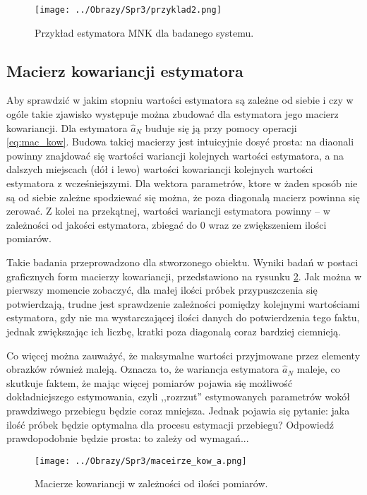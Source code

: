 \documentclass[12pt,a4paper]{article}
\begin{document}
\begin{figure}[H]
\centering
\texttt{[image: ../Obrazy/Spr3/przyklad2.png]} 
\caption{Przykład estymatora MNK dla badanego systemu.}
\label{fig:przyklad2}
\end{figure}

\subsection{Macierz kowariancji estymatora}
Aby sprawdzić w jakim stopniu wartości estymatora są zależne od siebie i czy w ogóle takie zjawisko występuje można zbudować dla estymatora jego macierz kowariancji.
Dla estymatora $\hat{a}_{N}$ buduje się ją przy pomocy operacji \ref{eq:mac_kow}.
Budowa takiej macierzy jest intuicyjnie dosyć prosta: na diaonali powinny znajdować się wartości wariancji kolejnych wartości estymatora, a na dalszych miejscach (dół i lewo) wartości kowariancji kolejnych wartości estymatora z wcześniejszymi. Dla wektora parametrów, ktore w żaden sposób nie są od siebie zależne spodziewać się można, że poza diagonalą macierz powinna się zerować.
Z kolei na przekątnej, wartości wariancji estymatora powinny -- w zależności od jakości estymatora, zbiegać do 0 wraz ze zwiększeniem ilości pomiarów.

Takie badania przeprowadzono dla stworzonego obiektu.
Wyniki badań w postaci graficznych form macierzy kowariancji, przedstawiono na rysunku \ref{fig:mac_kow}. Jak można w pierwszy momencie zobaczyć, dla małej ilości próbek przypuszczenia się potwierdzają, trudne jest sprawdzenie zależności pomiędzy kolejnymi wartościami estymatora, gdy nie ma wystarczającej ilości danych do potwierdzenia tego faktu, jednak zwiększając ich liczbę, kratki poza diagonalą coraz bardziej ciemnieją.

Co więcej można zauważyć, że maksymalne wartości przyjmowane przez elementy obrazków również maleją.
Oznacza to, że wariancja estymatora $\hat{a}_{N}$ maleje, co skutkuje faktem, że mając więcej pomiarów pojawia się możliwość dokładniejszego estymowania, czyli ,,rozrzut'' estymowanych parametrów wokół prawdziwego przebiegu będzie coraz mniejsza.
Jednak pojawia się pytanie: jaka ilość próbek będzie optymalna dla procesu estymacji przebiegu? Odpowiedź prawdopodobnie będzie prosta: to zależy od wymagań...


\begin{figure}[H]
\centering
\texttt{[image: ../Obrazy/Spr3/maceirze\_kow\_a.png]} 
\caption{Macierze kowariancji w zależności od ilości pomiarów.}
\label{fig:mac_kow}
\end{figure}
\end{document}
